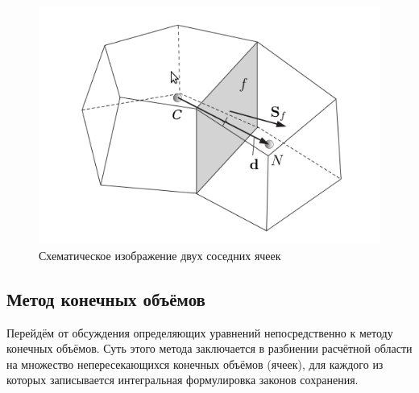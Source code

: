 \newpage
	\begin{figure}[h]
		\vspace{-1em}
			\centering
			\includegraphics[scale=0.5]{twoCells}
			\caption{Схематическое изображение двух соседних ячеек}
			\label{fig:twoCells}
		\end{figure}
	\subsection{Метод конечных объёмов}
		Перейдём от обсуждения определяющих уравнений непосредственно к методу конечных объёмов. Суть этого метода заключается в разбиении расчётной области на множество непересекающихся конечных объёмов (ячеек), для каждого из которых записывается интегральная формулировка законов сохранения.
		
